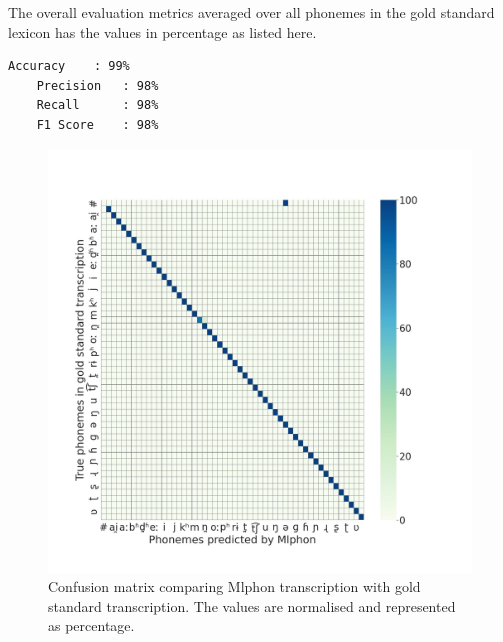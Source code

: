 The overall evaluation metrics averaged over all phonemes in the gold standard
lexicon has the values in percentage as listed here.

\begin{lstlisting}[basicstyle=\ttfamily]
	Accuracy	: 99%
	Precision	: 98%
	Recall		: 98%
	F1 Score	: 98%
\end{lstlisting}

\begin{figure}[htpb]
	\centering
	\includegraphics [width=0.9\linewidth]{confusion.jpg}
	\caption{Confusion matrix comparing Mlphon transcription with gold standard transcription. The values are normalised and represented as percentage.}
	\label{fig:confusionmatrix}
\end{figure}

